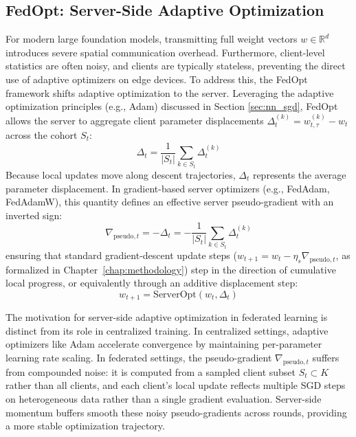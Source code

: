 \subsection{FedOpt: Server-Side Adaptive Optimization}
For modern large foundation models, transmitting full weight vectors $w \in \mathbb{R}^d$ introduces severe spatial communication overhead. Furthermore, client-level statistics are often noisy, and clients are typically stateless, preventing the direct use of adaptive optimizers on edge devices. To address this, the FedOpt framework \cite{reddi2021adaptive} shifts adaptive optimization to the server. Leveraging the adaptive optimization principles (e.g., Adam) discussed in Section \ref{sec:nn_sgd}, FedOpt allows the server to aggregate client parameter displacements $\Delta_t^{(k)} = w_{t,\tau}^{(k)} - w_t$ across the cohort $S_t$:
\begin{equation}
    \Delta_t = \frac{1}{|S_t|} \sum_{k \in S_t} \Delta_{t}^{(k)}
    \label{eq:fedopt_displacement}
\end{equation}
Because local updates move along descent trajectories, $\Delta_t$ represents the average parameter displacement. In gradient-based server optimizers (e.g., FedAdam, FedAdamW), this quantity defines an effective server pseudo-gradient with an inverted sign:
\begin{equation}
    \nabla_{\text{pseudo}, t} = - \Delta_t = - \frac{1}{|S_t|} \sum_{k \in S_t} \Delta_{t}^{(k)}
    \label{eq:fedopt_pseudo}
\end{equation}
ensuring that standard gradient-descent update steps ($w_{t+1} = w_t - \eta_s \nabla_{\text{pseudo}, t}$, as formalized in Chapter~\ref{chap:methodology}) step in the direction of cumulative local progress, or equivalently through an additive displacement step:
\begin{equation}
    w_{t+1} = \text{ServerOpt}(w_t, \Delta_t)
    \label{eq:fedopt_update}
\end{equation}

The motivation for server-side adaptive optimization in federated learning is distinct from its role in centralized training. In centralized settings, adaptive optimizers like Adam \cite{kingma2015adam} accelerate convergence by maintaining per-parameter learning rate scaling. In federated settings, the pseudo-gradient $\nabla_{\text{pseudo}, t}$ suffers from compounded noise: it is computed from a sampled client subset $S_t \subset K$ rather than all clients, and each client's local update reflects multiple SGD steps on heterogeneous data rather than a single gradient evaluation. Server-side momentum buffers smooth these noisy pseudo-gradients across rounds, providing a more stable optimization trajectory.


